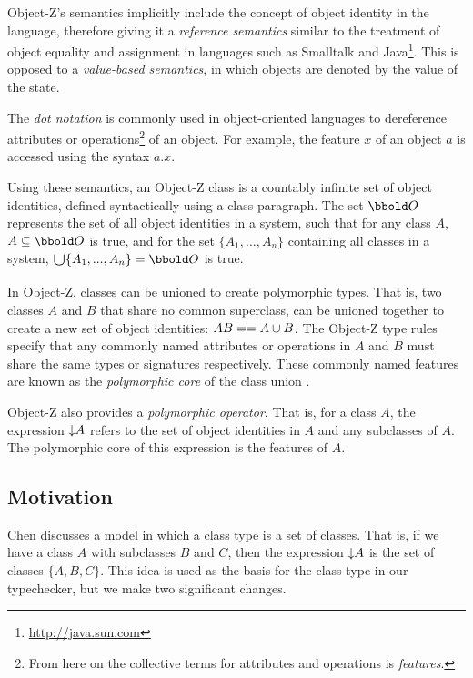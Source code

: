 Object-Z's semantics implicitly include the concept of object identity
in the language, therefore giving it a {\em reference semantics}
similar to the treatment of object equality and assignment in
languages such as Smalltalk \cite{goldberg83} and
Java\footnote{\url{http://java.sun.com}}. This is opposed to a {\em
value-based semantics}, in which objects are denoted by the value of
the state.

The {\em dot notation} is commonly used in object-oriented languages
to dereference attributes or operations\footnote{From here on
the collective terms for attributes and operations is {\em features}.}
of an object. For example, the feature $x$ of an object $a$ is
accessed using the syntax $a.x$.

Using these semantics, an Object-Z class is a countably infinite set
of object identities, defined syntactically using a class
paragraph. The set $\oid$ represents the set of all object identities
in a system, such that for any class $A$, $A \subseteq \oid$ is true,
and for the set $\{ A_{1}, ..., A_{n} \}$ containing all classes in a
system, $\duni \{ A_{1}, ..., A_{n} \} = \oid$ is true.

In Object-Z, classes can be unioned to create polymorphic types. That
is, two classes $A$ and $B$ that share no common superclass, can be
unioned together to create a new set of object identities: $AB == A
\classuni B$. The Object-Z type rules specify that any commonly named
attributes or operations in $A$ and $B$ must share the same types or
signatures respectively. These commonly named features are known as
the {\em polymorphic core} of the class union \cite{dong93}.

Object-Z also provides a {\em polymorphic operator}. That is, for a
class $A$, the expression $\mathord\downarrow A$ refers to the set of object
identities in $A$ and any subclasses of $A$. The polymorphic core of
this expression is the features of $A$.

\subsection{Motivation}

Chen \cite{chen94} discusses a model in which a class type is a set of
classes. That is, if we have a class $A$ with subclasses $B$ and $C$,
then the expression $\mathord\downarrow A$ is the set of classes $\{A, B,
C\}$. This idea is used as the basis for the class type in our
typechecker, but we make two significant changes.

